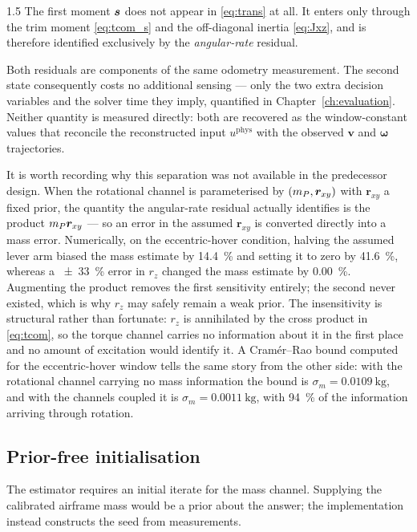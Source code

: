 \begin{spacing}{1.5}
The first moment $\bm{s}$ does not appear in \eqref{eq:trans} at all. It enters
only through the trim moment \eqref{eq:tcom_s} and the off-diagonal inertia
\eqref{eq:Jxz}, and is therefore identified exclusively by the
\emph{angular-rate} residual.

Both residuals are components of the same odometry measurement. The second state
consequently costs no additional sensing --- only the two extra decision
variables and the solver time they imply, quantified in
Chapter~\ref{ch:evaluation}. Neither quantity is measured directly: both are
recovered as the window-constant values that reconcile the reconstructed input
$u^{\mathrm{phys}}$ with the observed $\bm v$ and $\bm\omega$ trajectories.

It is worth recording why this separation was not available in the predecessor
design. When the rotational channel is parameterised by $(m_P,\bm r_{xy})$ with
$\bm r_{xy}$ a fixed prior, the quantity the angular-rate residual actually
identifies is the product $m_P\bm r_{xy}$ --- so an error in the assumed
$\bm r_{xy}$ is converted directly into a mass error. Numerically, on the
eccentric-hover condition, halving the assumed lever arm biased the mass estimate
by \SI{+14.4}{\percent} and setting it to zero by \SI{+41.6}{\percent}, whereas a
\SI{\pm33}{\percent} error in $r_z$ changed the mass estimate by
\SI{0.00}{\percent}. Augmenting the product removes the first sensitivity
entirely; the second never existed, which is why $r_z$ may safely remain a weak
prior. The insensitivity is structural rather than fortunate: $r_z$ is
annihilated by the cross product in \eqref{eq:tcom}, so the torque channel
carries no information about it in the first place and no amount of excitation
would identify it. A Cram\'er--Rao bound computed for the eccentric-hover window tells the
same story from the other side: with the rotational channel carrying no mass
information the bound is $\sigma_m=\SI{0.0109}{\kg}$, and with the channels
coupled it is $\sigma_m=\SI{0.0011}{\kg}$, with \SI{94}{\percent} of the
information arriving through rotation.

\subsection{Prior-free initialisation}\label{sec:model:seed}

The estimator requires an initial iterate for the mass channel. Supplying the
calibrated airframe mass would be a prior about the answer; the implementation
instead constructs the seed from measurements.


\end{spacing}

